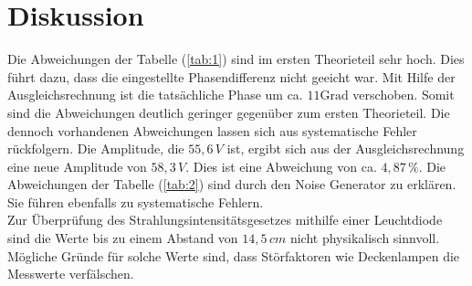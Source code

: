 \section{Diskussion}
Die Abweichungen der Tabelle (\ref{tab:1}) sind im ersten Theorieteil sehr hoch.
Dies führt dazu, dass die eingestellte Phasendifferenz nicht geeicht war.
Mit Hilfe der Ausgleichsrechnung ist die tatsächliche Phase um ca. $11 \text{Grad}$ verschoben.
Somit sind die Abweichungen deutlich geringer gegenüber zum ersten Theorieteil.
Die dennoch vorhandenen Abweichungen lassen sich aus systematische Fehler rückfolgern.
Die Amplitude, die $55,6 \, V$ ist, ergibt sich aus der Ausgleichsrechnung eine neue Amplitude von $58,3 \, V$.
Dies ist eine Abweichung von ca. $4,87 \, \%$.
Die Abweichungen der Tabelle (\ref{tab:2}) sind durch den Noise Generator zu erklären. Sie führen ebenfalls zu systematische Fehlern.\\
Zur Überprüfung des Strahlungsintensitätsgesetzes mithilfe einer Leuchtdiode sind die Werte bis zu einem
Abstand von $14,5 \, cm$ nicht physikalisch sinnvoll. Mögliche Gründe für solche Werte sind, dass Störfaktoren wie Deckenlampen die
Messwerte verfälschen.
